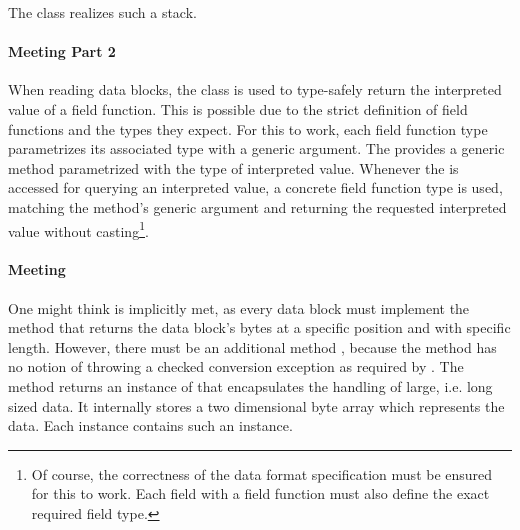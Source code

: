 The class \CLASSfieldFunctionStack{} realizes such a stack.


\paragraph{Meeting \REQUfieldInterpValueTyped{} Part 2}
\label{sec:MeetingREQUfieldInterpValueTyped2}

When reading data blocks, the class \CLASSfieldFunctionStack{} is used to type-safely return the interpreted value of a field function. This is possible due to the strict definition of field functions and the types they expect. For this to work, each field function type parametrizes its associated type with a generic argument. The \CLASSfieldFunctionStack{} provides a generic method parametrized with the type of interpreted value. Whenever the \CLASSfieldFunctionStack{} is accessed for querying an interpreted value, a concrete field function type is used, matching the method's generic argument and returning the requested interpreted value without casting\footnote{Of course, the correctness of the data format specification must be ensured for this to work. Each field with a field function must also define the exact required field type.}.


\paragraph{Meeting \REQUfieldBinaryValue{}}
\label{sec:MeetingREQUfieldBinaryValue}

One might think \REQUfieldBinaryValue{} is implicitly met, as every data block must implement the method \METHgetBytes{} that returns the data block's bytes at a specific position and with specific length. However, there must be an additional method \METHgetBinaryValue{}, because the 
\METHgetBytes{} method has no notion of throwing a checked conversion exception as required by . The method returns an instance of \CLASSbinaryValue{} that encapsulates the handling of large, i.e. long sized data. It internally stores a two dimensional byte array which represents the data. Each \IFfield{} instance contains such an instance.


